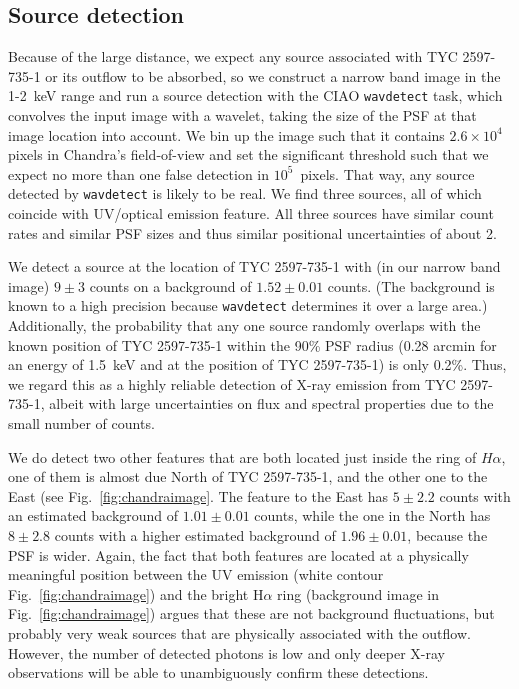 \documentclass[linenumbers]{aastex631}
\begin{document}
\subsection{Source detection}
Because of the large distance, we expect any source associated with TYC 2597-735-1 or its outflow to be absorbed, so we construct a narrow band image in the 1-2~keV range and run a source detection with the CIAO \texttt{wavdetect} task, which convolves the input image with a wavelet, taking the size of the PSF at that image location into account. We bin up the image such that it contains $2.6\times10^4$ pixels in Chandra's field-of-view and set the significant threshold such that we expect no more than one false detection in $10^5$~pixels. That way, any source detected by \texttt{wavdetect} is likely to be real. We find three sources, all of which coincide with UV/optical emission feature. All three sources have similar count rates and similar PSF sizes and thus similar positional uncertainties of about 2\arcsec{}.

We detect a source at the location of TYC 2597-735-1 with (in our narrow band image) $9\pm3$ counts on a background of $1.52\pm0.01$ counts. (The background is known to a high precision because \texttt{wavdetect} determines it over a large area.) Additionally, the probability that any one source randomly overlaps with the known position of TYC 2597-735-1 within the 90\% PSF radius (0.28 arcmin for an energy of 1.5~keV and at the position of TYC 2597-735-1) is only 0.2\%. Thus, we regard this as a highly reliable detection of X-ray emission from TYC 2597-735-1, albeit with large uncertainties on flux and spectral properties due to the small number of counts.

We do detect two other features that are both located just inside the ring of $H\alpha$, one of them is almost due North of TYC 2597-735-1, and the other one to the East (see Fig.~\ref{fig:chandraimage}. The feature to the East has $5\pm2.2$ counts with an estimated background of $1.01\pm0.01$ counts, while the one in the North has $8\pm2.8$ counts with a higher estimated background of $1.96\pm0.01$, because the PSF is wider. Again, the fact that both features are located at a physically meaningful position between the UV emission (white contour Fig.~\ref{fig:chandraimage}) and the bright H$\alpha$ ring (background image in Fig.~\ref{fig:chandraimage}) argues that these are not background fluctuations, but probably very weak sources that are physically associated with the outflow. However, the number of detected photons is low and only deeper X-ray observations will be able to unambiguously confirm these detections.
\end{document}
